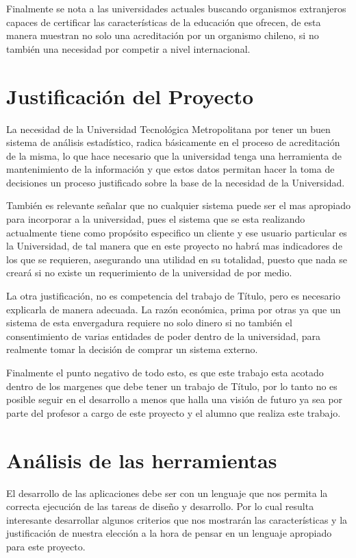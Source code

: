 \documentclass[a4paper,12pt,openany,oneside]{book}
\begin{document}
Finalmente se nota a las universidades actuales buscando organismos extranjeros capaces de certificar las características de la educación que ofrecen, de esta manera muestran no solo una acreditación por un organismo chileno, si no también una necesidad por competir a nivel internacional\cite{data3}.

\section{Justificación del Proyecto}
La necesidad de la Universidad Tecnológica Metropolitana por tener un buen sistema de análisis estadístico, radica básicamente en el proceso de acreditación de la misma, lo que hace necesario que la universidad tenga una herramienta de mantenimiento de la información y que estos datos permitan hacer la toma de decisiones un proceso justificado sobre la base de la necesidad de la Universidad.

También es relevante señalar que no cualquier sistema puede ser el mas apropiado para incorporar a la universidad, pues el sistema que se esta realizando actualmente tiene como propósito especifico un cliente y ese usuario particular es la Universidad, de tal manera que en este proyecto no habrá mas indicadores de los que se requieren, asegurando una utilidad en su totalidad, puesto que nada se creará si no existe un requerimiento de la universidad de por medio.

La otra justificación, no es competencia del trabajo de Título, pero es necesario explicarla de manera adecuada. La razón económica, prima por otras ya que un sistema de esta envergadura requiere no solo dinero si no también el consentimiento de varias entidades de poder dentro de la universidad, para realmente tomar la decisión de comprar un sistema externo.

Finalmente el punto negativo de todo esto, es que este trabajo esta acotado dentro de los margenes que debe tener un trabajo de Título, por lo tanto no es posible seguir en el desarrollo a menos que halla una visión de futuro ya sea por parte del profesor a cargo de este proyecto y el alumno que realiza este trabajo.
\section{Análisis de las herramientas}
El desarrollo de las aplicaciones debe ser con un lenguaje que nos permita la correcta ejecución de las tareas de diseño y desarrollo. Por lo cual resulta interesante desarrollar algunos criterios que nos mostrarán las características y la justificación de nuestra elección a la hora de pensar en un lenguaje apropiado para este proyecto.
\end{document}
